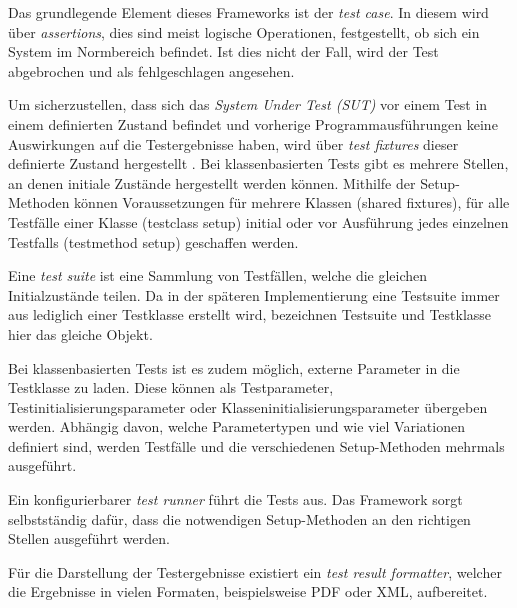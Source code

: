 Das grundlegende Element dieses Frameworks ist der \textit{test case}. In diesem wird über \textit{assertions}, dies sind meist logische Operationen, festgestellt, ob sich ein System im Normbereich befindet. Ist dies nicht der Fall, wird der Test abgebrochen und als fehlgeschlagen angesehen.

Um sicherzustellen, dass sich das \textit{System Under Test (SUT)} vor einem Test in einem definierten Zustand befindet und vorherige Programmausführungen keine Auswirkungen auf die Testergebnisse haben, wird über \textit{test fixtures} dieser definierte Zustand hergestellt \cite{xUnitpatterns}. Bei klassenbasierten Tests gibt es mehrere Stellen, an denen initiale Zustände hergestellt werden können. Mithilfe der Setup-Methoden können Voraussetzungen für mehrere Klassen (shared fixtures), für alle Testfälle einer Klasse (testclass setup) initial oder vor Ausführung jedes einzelnen Testfalls (testmethod setup) geschaffen werden.

Eine \textit{test suite} ist eine Sammlung von Testfällen, welche die gleichen Initialzustände teilen. Da in der späteren Implementierung eine Testsuite immer aus lediglich einer Testklasse erstellt wird, bezeichnen Testsuite und Testklasse hier das gleiche Objekt. 

Bei klassenbasierten Tests ist es zudem möglich, externe Parameter in die Testklasse zu laden. Diese können als Testparameter, Testinitialisierungsparameter oder Klasseninitialisierungsparameter übergeben werden. Abhängig davon, welche Parametertypen und wie viel Variationen definiert sind, werden Testfälle und die verschiedenen Setup-Methoden mehrmals ausgeführt. 


Ein konfigurierbarer \textit{test runner} führt die Tests aus. Das Framework sorgt selbstständig dafür, dass die notwendigen Setup-Methoden an den richtigen Stellen ausgeführt werden.

Für die Darstellung der Testergebnisse existiert ein \textit{test result formatter}, welcher die Ergebnisse in vielen Formaten, beispielsweise PDF oder XML, aufbereitet.

